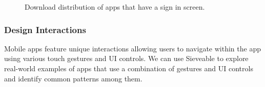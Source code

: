 \begin{figure}[H]
\centering
{}%
\qquad
{}%
\caption{Download distribution of apps that have a sign in screen.}%
\label{fig:fig_signInDownloadDist}
\end{figure}

\subsubsection{Design Interactions}
Mobile apps feature unique interactions allowing users to navigate within the app using various touch gestures and UI controls. We can use Sieveable to explore real-world examples of apps that use a combination of gestures and UI controls and identify common patterns among them.
	
